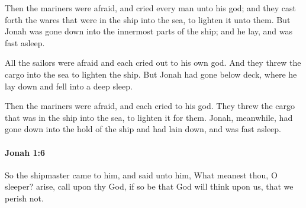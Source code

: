 			\begin{versebox}
					\item[BHS] 
					\item[LXX] 
					\item[ASV] Then the mariners were afraid, and cried every man unto his god; and they cast forth the wares that were in the ship into the sea, to lighten it unto them. But Jonah was gone down into the innermost parts of the ship; and he lay, and was fast asleep.
					\item[NIV] All the sailors were afraid and each cried out to his own god. And they threw the cargo into the sea to lighten the ship. But Jonah had gone below deck, where he lay down and fell into a deep sleep.
					\item[NRSV] Then the mariners were afraid, and each cried to his god. They threw the cargo that was in the ship into the sea, to lighten it for them. Jonah, meanwhile, had gone down into the hold of the ship and had lain down, and was fast asleep.
			\end{versebox}

		\paragraph{Jonah 1:6} %
			\label{JONAH-1-6}

			So the shipmaster came to him, and said unto him, What meanest thou, O sleeper? arise, call upon thy God, if so be that God will think upon us, that we perish not.

